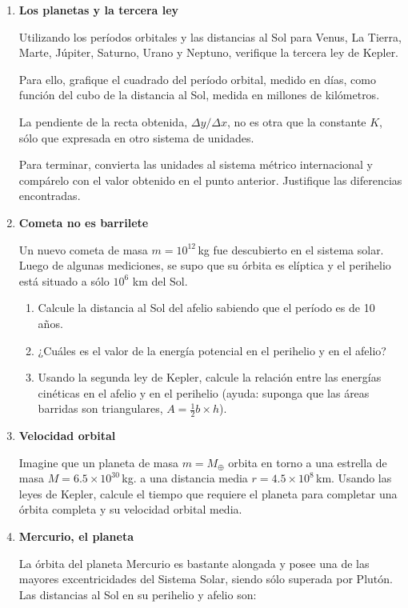 \documentclass[a4paper,12pt]{article}
\begin{document}
\begin{enumerate}
\item{\bf{Los planetas y la tercera ley}}

Utilizando los períodos orbitales y las distancias al Sol para Venus, La
Tierra, Marte, Júpiter, Saturno, Urano y Neptuno, verifique la tercera ley de
Kepler. 

Para ello, grafique el cuadrado del período orbital, medido en días, como
función del cubo de la distancia al Sol, medida en millones de kilómetros.

La pendiente de la recta obtenida, $\Delta y / \Delta x$, no es otra que la
constante $K$, sólo que expresada en otro sistema de unidades. 

Para terminar, convierta las unidades al sistema métrico internacional y
compárelo con el valor obtenido en el punto anterior. Justifique las diferencias encontradas.

\item{\bf{Cometa no es barrilete}}

Un nuevo cometa de masa $m=10^{12}$\,kg fue descubierto en el sistema solar.
Luego de algunas mediciones, se supo que su órbita es elíptica y el perihelio
está situado a sólo $10^6$ km del Sol.

\begin{enumerate}
\item Calcule la distancia al Sol del afelio sabiendo que el período es de 10 años.
\item ¿Cuáles es el valor de la energía potencial en el perihelio y en el afelio?
\item Usando la segunda ley de Kepler, calcule la relación entre las energías
cinéticas en el afelio y en el perihelio (ayuda: suponga que las áreas barridas
son triangulares, $A=\frac{1}{2} b \times h$).
\end{enumerate}

\item{\bf{Velocidad orbital}}

Imagine que un planeta de masa $m=M_\oplus$ orbita en torno a una estrella de
masa $M=6.5 \times 10^{30}$\,kg. a una distancia media $r=4.5\times10^8$\,km. Usando
las leyes de Kepler, calcule el tiempo que requiere el planeta para completar
una órbita completa y su velocidad orbital media.

\item{\bf{Mercurio, el planeta}}

La órbita del planeta Mercurio es bastante alongada y posee una de las mayores
excentricidades del Sistema Solar, siendo sólo superada por Plutón. Las
distancias al Sol en su perihelio y afelio son:


\end{enumerate}
\end{document}
